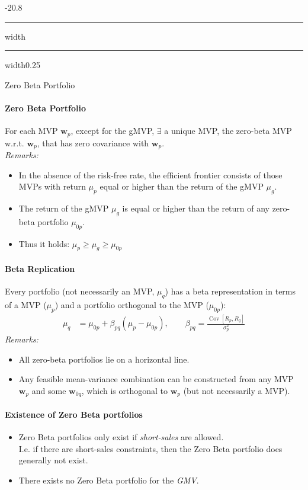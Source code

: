 \documentclass[a4paper,landscape,8pt,fleqn]{scrartcl}
\makeatletter
\renewcommand{\subsection}{\@startsection{subsection}{1}{0mm}%
{-2\baselineskip}{0.8\baselineskip}%
{\hrule depth 0.2pt width\columnwidth\hrule depth0.75pt
width0.25\columnwidth\vspace*{1.2em}\large\bfseries}}
\DeclareMathOperator{\Cov}{Cov}				%
\makeatother
\begin{document}
\begin{multicols*}{3}
\subsection{Zero Beta Portfolio}

\paragraph{Zero Beta Portfolio}
For each MVP $\bm w_p$, except for the gMVP, $\exists$ a unique MVP, the zero-beta MVP w.r.t. $\bm w_p$, that has zero covariance with $\bm w_p$. \\
\textit{Remarks:}
\begin{itemize}
\item In the absence of the risk-free rate, the efficient frontier consists of those MVPs with return $\mu_p$ equal or higher than the return of the gMVP $\mu_g$.
\item The return of the gMVP $\mu_g$ is equal or higher than the return of any zero-beta portfolio $\mu_{0p}$.
\item Thus it holds: $\mu_p \geq \mu_g \geq \mu_{0p}$
\end{itemize}

\paragraph{Beta Replication}
Every portfolio (not necessarily an MVP, $\mu_q$) has a beta representation in terms of a MVP ($\mu_p$) and a portfolio orthogonal to the MVP ($\mu_{0p}$):
\begin{align*}
\mu_q &= \mu_{0 p} + \beta_{pq} (\mu_p - \mu_{0p}), \qquad \beta_{pq} = \frac{\Cov \left[ R_p, R_q \right]}{\sigma_p^2}
\end{align*}
\textit{Remarks:}
\begin{itemize}
\item All zero-beta portfolios lie on a horizontal line.
\item Any feasible mean-variance combination can be constructed from any MVP $\bm w_p$ and some $\bm w_{0q}$, which is orthogonal to $\bm w_p$ (but not necessarily a MVP).
\end{itemize}

\paragraph{Existence of Zero Beta portfolios}
\begin{itemize}
\item Zero Beta portfolios only exist if \textit{short-sales} are allowed. \\
I.e. if there are short-sales constraints, then the Zero Beta portfolio does generally not exist.
\item There exists no Zero Beta portfolio for the \textit{GMV}.
\end{itemize}


\end{multicols*}
\end{document}
